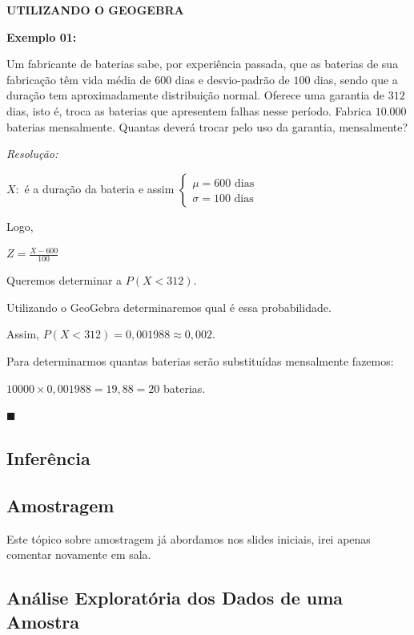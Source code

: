 \documentclass[oneside,a4paper,12pt]{article}
\begin{document}
{\bf UTILIZANDO O GEOGEBRA}

{\bf Exemplo 01:}

Um fabricante de baterias sabe, por experiência passada, que as baterias de sua fabricação têm vida média de $600$ dias e desvio-padrão de $100$ dias, sendo que a duração tem aproximadamente distribuição normal. Oferece uma garantia de $312$ dias, isto é, troca as baterias que apresentem falhas nesse período. Fabrica $10.000$ baterias mensalmente. Quantas deverá trocar pelo uso da garantia, mensalmente?

{\it Resolução:}

$X:$ é a duração da bateria e assim $\begin{cases}
\mu = 600 \text{ dias} \\
\sigma = 100 \text{ dias}
\end{cases}
$

Logo,

$Z = \displaystyle \frac{X - 600}{100}$

Queremos determinar a $P(X < 312)$. 

Utilizando o GeoGebra determinaremos qual é essa probabilidade.

Assim, $P(X < 312) = 0,001988 \approx 0,002$. 

Para determinarmos quantas baterias serão substituídas mensalmente fazemos:

$10000 \times 0,001988 = 19,88 = 20$ baterias.

\begin{flushright}
	$\blacksquare$
\end{flushright}



\newpage
\begin{snugshade}
	\section{Inferência}
\end{snugshade}

\subsection{Amostragem}

Este tópico sobre amostragem já abordamos nos slides iniciais, irei apenas comentar novamente em sala.

\subsection{Análise Exploratória dos Dados de uma Amostra}
\end{document}
